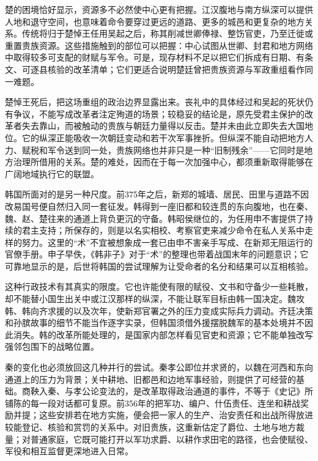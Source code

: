 楚的困境恰好显示，资源多不必然使中心更有把握。江汉腹地与南方纵深可以提供人地和退守空间，也意味着命令要穿过更远的道路、更多的城邑和更复杂的地方关系。传统将归于楚悼王任用吴起之后，称其削减世卿俸禄、整饬官吏，乃至迁徙或重置贵族资源。这些措施触到的部位可以把握：中心试图从世卿、封君和地方网络中取得较多可支配的财赋与军令。可是，现存材料不足以把它们拆成有日期、有条文、可逐县核验的改革清单；它们更适合说明楚廷曾把贵族资源与军政重组看作同一难题。

楚悼王死后，把这场重组的政治边界显露出来。丧礼中的具体经过和吴起的死状仍有争议，不能写成改革者注定殉道的场景；较稳妥的结论是，原先受君主保护的改革者失去靠山，而被触动的贵族与朝廷力量得以反击。楚并未由此立即失去大国地位。它的纵深正能吸收一次朝廷变动和若干次军事挫折。但纵深不能自动把地方人力、赋税和军令送到同一处，贵族网络也并非只是一种“旧制残余”——它同时是地方治理所借用的关系。楚的难处，因而在于每一次加强中心，都须重新取得能够在广阔地域执行它的联盟。

韩国所面对的是另一种尺度。前375年之后，新郑的城墙、居民、田里与道路不因改易国号便自然归入同一套征发。韩得到一座旧都和较连贯的东向腹地，也在秦、魏、赵、楚往来的通道上背负更沉的守备。韩昭侯继位的，为任用申不害提供了持续的君主支持；所保存的，则是以名实相校、考察官吏来减少命令在私人关系中走样的努力。这里的“术”不宜被想象成一套已由申不害亲手写成、在新郑无阻运行的官僚手册。申子早佚，《韩非子》对于“术”的整理也带着战国末年的问题意识；它可靠地显示的是，后世将韩国的尝试理解为让受命者的名分和结果可以互相核验。

这种行政技术有其真实的限度。它也许能使有限的赋役、文书和守备少一些耗散，却不能替小国生出关中或江汉那样的纵深，不能让联军目标由韩一国决定。魏攻韩、韩向齐求援的以及次年，使新郑官署之外的压力变成实际兵力调动。齐廷决策和孙膑故事的细节不能当作逐字实录，但韩国须借外援摆脱魏军的基本处境并不因此消失。韩的改革所能处理的，是国家内部怎样看见官吏和资源；它不能单独改写强邻包围下的战略位置。

秦的变化也必须放回这几种并行的尝试。秦孝公即位并求贤的，以魏在河西和东向通道上的压力为背景；关中耕地、旧都邑和边地军事经验，则提供了可经营的基础。商鞅入秦、与孝公论变法的，是改革取得政治通道的事件，不等于《史记》所铺陈的每一段对话都可复原。前356年的把军功、编户、什伍责任、连坐和耕战奖励并提；这些安排若在地方实施，便会把一家人的生产、治安责任和出战所得放进较能登记、核验和赏罚的关系中。对旧贵族，这重新估定了爵位、土地与地方裁量；对普通家庭，它既可能打开以军功求爵、以耕作求田宅的路径，也会使赋役、军役和相互监督更深地进入日常。

